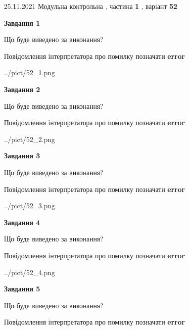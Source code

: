 \documentclass[10pt, ukrainian]{article}
\begin{document}
{25.11.2021 Модульна контрольна , частина \textbf { 1 }, варіант  \No \textbf { 52 }\par}
{
\begin {large}

{\begin {center}\textbf{Завдання 1}\end {center}}\par
Що буде виведено за виконання? \par
Повідомлення інтерпретатора про помилку позначати \textbf{error}

\begin{center}
	{../pict/52_1.png}
\end{center}
\newpage

{\begin {center}\textbf{Завдання 2}\end {center}}\par
Що буде виведено за виконання? \par
Повідомлення інтерпретатора про помилку позначати \textbf{error}

\begin{center}
	{../pict/52_2.png}
\end{center}
\newpage

{\begin {center}\textbf{Завдання 3}\end {center}}\par
Що буде виведено за виконання? \par
Повідомлення інтерпретатора про помилку позначати \textbf{error}

\begin{center}
	{../pict/52_3.png}
\end{center}
\newpage

{\begin {center}\textbf{Завдання 4}\end {center}}\par
Що буде виведено за виконання? \par
Повідомлення інтерпретатора про помилку позначати \textbf{error}

\begin{center}
	{../pict/52_4.png}
\end{center}
\newpage

{\begin {center}\textbf{Завдання 5}\end {center}}\par
Що буде виведено за виконання? \par
Повідомлення інтерпретатора про помилку позначати \textbf{error}


\end{large}}
\end{document}
